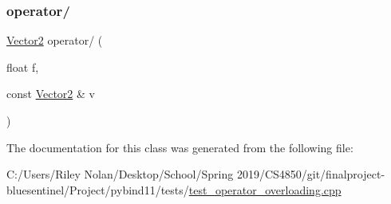 \mbox{\label{class_vector2_ad7c0be18e52fd9093ccb301023ff5117}} 
\subsubsection{\texorpdfstring{operator/}{operator/}}
{\footnotesize\ttfamily \mbox{\hyperlink{class_vector2}{Vector2}} operator/ (\begin{DoxyParamCaption}\item[{float}]{f,  }\item[{const \mbox{\hyperlink{class_vector2}{Vector2}} \&}]{v }\end{DoxyParamCaption})\hspace{0.3cm}{\ttfamily [friend]}}



The documentation for this class was generated from the following file\+:\begin{DoxyCompactItemize}
\item 
C\+:/\+Users/\+Riley Nolan/\+Desktop/\+School/\+Spring 2019/\+C\+S4850/git/finalproject-\/bluesentinel/\+Project/pybind11/tests/\mbox{\hyperlink{test__operator__overloading_8cpp}{test\+\_\+operator\+\_\+overloading.\+cpp}}\end{DoxyCompactItemize}
